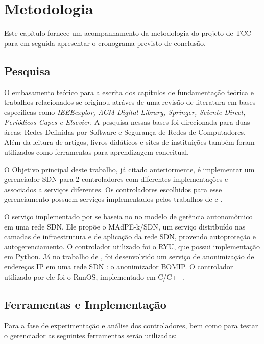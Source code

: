 

\chapter{Metodologia}

 Este capítulo fornece um acompanhamento da metodologia do projeto de TCC para em seguida apresentar o cronograma previsto de conclusão.
 
 \section{Pesquisa}
 
 O embasamento teórico para a escrita dos capítulos de fundamentação teórica e trabalhos relacionados se originou atráves de uma revisão de literatura em bases específicas como \emph{IEEEexplor, ACM Digital Library, Springer, Sciente Direct, Periódicos Capes e Elsevier}. A pesquisa nessas bases foi direcionada para duas áreas: Redes Definidas por Software e Segurança de Redes de Computadores. Além da leitura de artigos, livros didáticos e sites de instituições também foram utilizados como ferramentas para aprendizagem conceitual.
\par O Objetivo principal deste trabalho, já citado anteriormente, é implementar um gerenciador SDN para 2 controladores com diferentes implementações e associados a serviços diferentes. Os controladores escolhidos para esse gerenciamento possuem serviços implementados pelos trabalhos de   e .
\par O serviço implementado por  se baseia no no modelo de gerência autonomômico em uma rede SDN. Ele propõe o MAdPE-k/SDN, um serviço distribuído nas camadas de infraestrutura e de aplicação da rede SDN, provendo autoproteção e autogerenciamento. O controlador utilizado foi o RYU, que possui implementação em Python. Já no trabalho de , foi desenvolvido um serviço de anonimização de endereços IP em uma rede SDN : o anonimizador BOMIP. O controlador utilizado por ele foi o RunOS, implementado em C/C++. 

\section{Ferramentas e Implementação}

\par Para a fase de experimentação e análise dos controladores, bem como para testar o gerenciador as seguintes ferramentas serão utilizadas:

